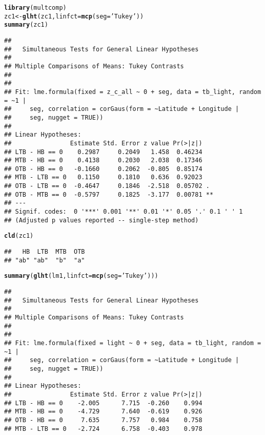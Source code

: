 \documentclass[letterpaper,12pt]{article}\usepackage[]{graphicx}\usepackage[]{color}
\makeatletter
\newcommand{\hlstr}[1]{\textcolor[rgb]{0.192,0.494,0.8}{#1}}%
\newcommand{\hlstd}[1]{\textcolor[rgb]{0.345,0.345,0.345}{#1}}%
\newcommand{\hlkwb}[1]{\textcolor[rgb]{0.69,0.353,0.396}{#1}}%
\newcommand{\hlkwc}[1]{\textcolor[rgb]{0.333,0.667,0.333}{#1}}%
\newcommand{\hlkwd}[1]{\textcolor[rgb]{0.737,0.353,0.396}{\textbf{#1}}}%
\newenvironment{kframe}{%
 \def\at@end@of@kframe{}%
 \ifinner\ifhmode%
  \def\at@end@of@kframe{\end{minipage}}%
  \begin{minipage}{\columnwidth}%
 \fi\fi%
 \def\FrameCommand##1{\hskip\@totalleftmargin \hskip-\fboxsep
 \colorbox{shadecolor}{##1}\hskip-\fboxsep
     \hskip-\linewidth \hskip-\@totalleftmargin \hskip\columnwidth}%
 \MakeFramed {\advance\hsize-\width
   \@totalleftmargin\z@ \linewidth\hsize
   \@setminipage}}%
 {\par\unskip\endMakeFramed%
 \at@end@of@kframe}
\newenvironment{knitrout}{}{} %
\makeatother
\begin{document}
\clearpage
\begin{knitrout}
\color{fgcolor}\begin{kframe}
\begin{alltt}
\hlkwd{library}\hlstd{(multcomp)}
\hlstd{zc1} \hlkwb{<-} \hlkwd{glht}\hlstd{(zc1,} \hlkwc{linfct} \hlstd{=} \hlkwd{mcp}\hlstd{(}\hlkwc{seg} \hlstd{=} \hlstr{'Tukey'}\hlstd{))}
\hlkwd{summary}\hlstd{(zc1)}
\end{alltt}
\begin{verbatim}
## 
## 	 Simultaneous Tests for General Linear Hypotheses
## 
## Multiple Comparisons of Means: Tukey Contrasts
## 
## 
## Fit: lme.formula(fixed = z_c_all ~ 0 + seg, data = tb_light, random = ~1 | 
##     seg, correlation = corGaus(form = ~Latitude + Longitude | 
##     seg, nugget = TRUE))
## 
## Linear Hypotheses:
##                Estimate Std. Error z value Pr(>|z|)   
## LTB - HB == 0    0.2987     0.2049   1.458  0.46234   
## MTB - HB == 0    0.4138     0.2030   2.038  0.17346   
## OTB - HB == 0   -0.1660     0.2062  -0.805  0.85174   
## MTB - LTB == 0   0.1150     0.1810   0.636  0.92023   
## OTB - LTB == 0  -0.4647     0.1846  -2.518  0.05702 . 
## OTB - MTB == 0  -0.5797     0.1825  -3.177  0.00781 **
## ---
## Signif. codes:  0 '***' 0.001 '**' 0.01 '*' 0.05 '.' 0.1 ' ' 1
## (Adjusted p values reported -- single-step method)
\end{verbatim}
\begin{alltt}
\hlkwd{cld}\hlstd{(zc1)}
\end{alltt}
\begin{verbatim}
##   HB  LTB  MTB  OTB 
## "ab" "ab"  "b"  "a"
\end{verbatim}
\begin{alltt}
\hlkwd{summary}\hlstd{(}\hlkwd{glht}\hlstd{(lm1,} \hlkwc{linfct} \hlstd{=} \hlkwd{mcp}\hlstd{(}\hlkwc{seg} \hlstd{=} \hlstr{'Tukey'}\hlstd{)))}
\end{alltt}
\begin{verbatim}
## 
## 	 Simultaneous Tests for General Linear Hypotheses
## 
## Multiple Comparisons of Means: Tukey Contrasts
## 
## 
## Fit: lme.formula(fixed = light ~ 0 + seg, data = tb_light, random = ~1 | 
##     seg, correlation = corGaus(form = ~Latitude + Longitude | 
##     seg, nugget = TRUE))
## 
## Linear Hypotheses:
##                Estimate Std. Error z value Pr(>|z|)
## LTB - HB == 0    -2.005      7.715  -0.260    0.994
## MTB - HB == 0    -4.729      7.640  -0.619    0.926
## OTB - HB == 0     7.635      7.757   0.984    0.758
## MTB - LTB == 0   -2.724      6.758  -0.403    0.978

\end{verbatim}
\end{kframe}
\end{knitrout}
\end{document}
